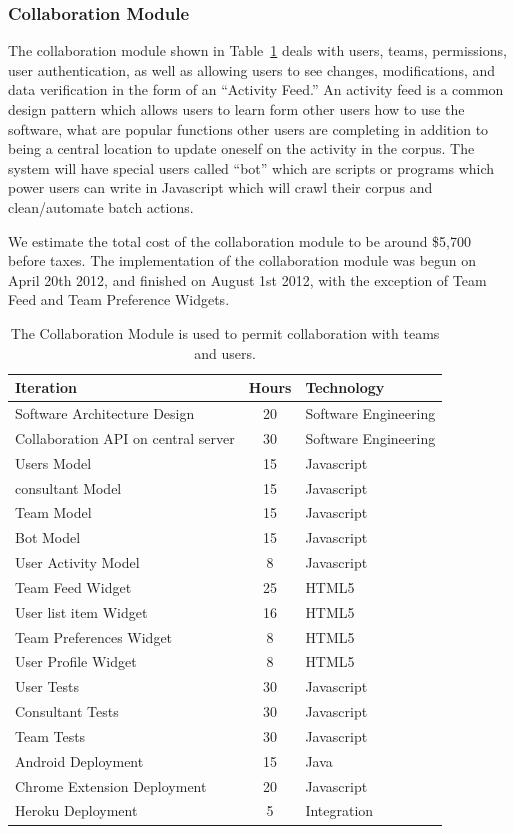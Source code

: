\documentclass[12pt]{article}
\begin{document}
\newpage
\subsubsection{Collaboration Module}
The collaboration module shown in Table~\ref{table-collaboration}  deals with users, teams, permissions, user authentication,  as well as allowing users to see changes, modifications, and data verification in the form of an ``Activity Feed.'' An activity feed is a common design pattern which allows users to learn form other users how to use the software, what are popular functions other users are completing in addition to being a central location to update oneself on the activity in the corpus. The system will have special users called ``bot'' which are scripts or programs which power users can write in Javascript which will crawl their corpus and clean/automate batch actions.

We estimate the total cost of the collaboration module to be around \$5,700 before taxes. The implementation of the collaboration module was begun on April 20th 2012, and finished on August 1st 2012, with the exception of Team Feed and Team Preference Widgets. 
\begin{table}[h]
\begin{center}
  \begin{tabular}{ | lcl | }
\hline
Iteration&  Hours&  Technology  \\
\hline
Software Architecture Design& 20& Software Engineering  \\ 
Collaboration API on central server&  30& Software Engineering\\ 
Users Model&  15& Javascript  \\ 
consultant Model& 15& Javascript  \\ 
Team Model& 15& Javascript  \\ 
Bot Model&  15& Javascript  \\ 
User Activity Model&  8&  Javascript  \\ 
Team Feed Widget& 25& HTML5 \\ 
User list item Widget&  16& HTML5 \\ 
Team Preferences Widget&  8&  HTML5 \\ 
User Profile Widget&  8&  HTML5 \\ 
User Tests& 30& Javascript \\ 
Consultant Tests& 30& Javascript  \\ 
Team Tests& 30& Javascript  \\ 
Android Deployment& 15& Java  \\ 
Chrome Extension Deployment&  20& Javascript \\ 
Heroku Deployment&  5&  Integration \\ 
\hline
  \end{tabular}
  \caption{The Collaboration Module is used to permit collaboration with teams and users. }
\label{table-collaboration}
  \end{center}
\end{table}
\end{document}
